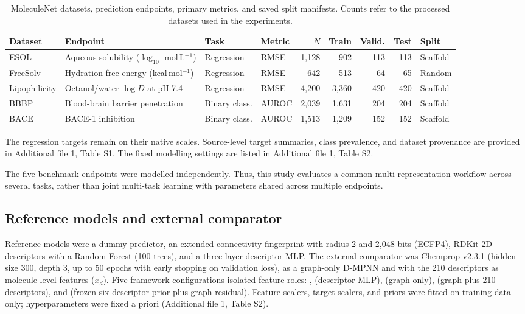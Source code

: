\begin{table}[t]
\caption{MoleculeNet datasets, prediction endpoints, primary metrics, and saved split manifests. Counts refer to the processed datasets used in the experiments.}
\label{tab:datasets}
\centering
\scriptsize
\setlength{\tabcolsep}{2.2pt}
\begin{tabular}{@{}p{}p{}p{}p{}rrrrp{}@{}}
\toprule
Dataset & Endpoint & Task & Metric & $N$ & Train & Valid. & Test & Split \\
\midrule
ESOL & Aqueous solubility ($\log_{10}$ mol\,L$^{-1}$) & Regression & RMSE & 1,128 & 902 & 113 & 113 & Scaffold \\
FreeSolv & Hydration free energy (kcal\,mol$^{-1}$) & Regression & RMSE & 642 & 513 & 64 & 65 & Random \\
Lipophilicity & Octanol/water $\log D$ at pH 7.4 & Regression & RMSE & 4,200 & 3,360 & 420 & 420 & Scaffold \\
BBBP & Blood-brain barrier penetration & Binary class. & AUROC & 2,039 & 1,631 & 204 & 204 & Scaffold \\
BACE & BACE-1 inhibition & Binary class. & AUROC & 1,513 & 1,209 & 152 & 152 & Scaffold \\
\bottomrule
\end{tabular}
\end{table}

The regression targets remain on their native scales. Source-level target summaries, class prevalence, and dataset provenance are provided in Additional file 1, Table S1. The fixed modelling settings are listed in Additional file 1, Table S2.

The five benchmark endpoints were modelled independently. Thus, this study evaluates a common multi-representation workflow across several tasks, rather than joint multi-task learning with parameters shared across multiple endpoints.

\subsection{Reference models and external comparator}\label{subsec:models}

Reference models were a dummy predictor, an extended-connectivity fingerprint with radius 2 and 2,048 bits (ECFP4), RDKit 2D descriptors with a Random Forest (100 trees), and a three-layer descriptor MLP. The external comparator was Chemprop v2.3.1 \cite{graff2026chemprop} (hidden size 300, depth 3, up to 50 epochs with early stopping on validation loss), as a graph-only D-MPNN and with the 210 descriptors as molecule-level features ($x_d$). Five framework configurations isolated feature roles: ,  (descriptor MLP),  (graph only),  (graph plus 210 descriptors), and  (frozen six-descriptor prior plus graph residual). Feature scalers, target scalers, and priors were fitted on training data only; hyperparameters were fixed a priori (Additional file 1, Table S2).

